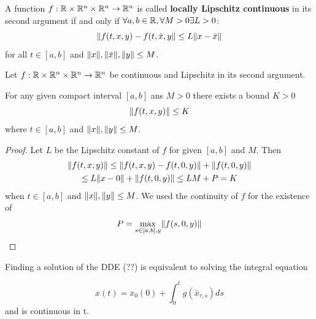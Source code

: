\documentclass[10pt]{article}
\begin{document}
\begin{definition}
    \label{definition-lipschitz}

    A function $f:\mathbb{R}\times\mathbb{R}^n\times\mathbb{R}^n\rightarrow\mathbb{R}^n$ is called \textbf{locally Lipschitz continuous} in its second argument if and only if $\forall a,b\in\mathbb{R},\forall M>0 \exists L>0$:
    \begin{equation}
        \lVert f(t,x,y) - f(t,\bar{x},y\rVert \leq L\lVert x - \bar{x}\rVert
    \end{equation}
    for all $t\in [a,b]$ and $\lVert x\rVert,\lVert\bar{x}\rVert,\lVert y\rVert\leq M$.
\end{definition}

\begin{lemma}
    \label{lemma-bounded-f}

    Let $f:\mathbb{R}\times\mathbb{R}^n\times\mathbb{R}^n\rightarrow\mathbb{R}^n$ be continuous and Lipschitz in its second argument.

    For any given compact interval $[a,b]$ ans $M>0$ there exists a bound $K>0$
    \begin{equation}
        \lVert f(t,x,y)\rVert\leq K
    \end{equation}
    where $t\in[a,b]$ and $\lVert x\rVert,\lVert y\rVert\leq M$.
\end{lemma}

\begin{proof}
    Let $L$ be the Lipschitz constant of $f$ for given $[a,b]$ and $M$. Then
    \begin{multline}
        \lVert f(t,x,y)\rVert \leq \lVert f(t,x,y) - f(t,0,y)\rVert + \lVert f(t,0,y)\rVert\\
        \leq L\lVert x-0\rVert + \lVert f(t,0,y)\rVert \leq LM+P = K
    \end{multline}
    when $t\in[a,b]$ and $\lVert x\rVert,\lVert y\rVert\leq M$. We used the continuity of $f$ for the existence of
    \begin{equation}
        P = \max_{s\in [a,b],y}\lVert f(s,0,y)\rVert
    \end{equation}
\end{proof}

\begin{lemma}
    \label{lemma-integral-equation}


    Finding a solution of the DDE (??) is equivalent to solving the integral equation

    \begin{equation}
        x(t) = x_0(0) + \int_0^t g(\bar{x}_{\tau,s})ds
    \end{equation}
    and is continuous in t.
\end{lemma}
\end{document}
